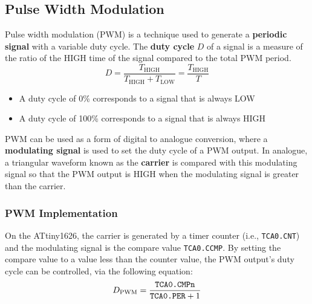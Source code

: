 \documentclass{article}
\begin{document}
\subsection{Pulse Width Modulation}
Pulse width modulation (PWM) is a technique used to generate a
\textbf{periodic signal} with a variable duty cycle. The \textbf{duty
cycle} \(D\) of a signal is a measure of the ratio of the HIGH time of
the signal compared to the total PWM period.
\begin{equation*}
    D = \frac{T_\mathrm{HIGH}}{T_\mathrm{HIGH} + T_\mathrm{LOW}} = \frac{T_\mathrm{HIGH}}{T}
\end{equation*}
\begin{itemize}
    \item A duty cycle of 0\% corresponds to a signal that is always LOW
    \item A duty cycle of 100\% corresponds to a signal that is always HIGH
\end{itemize}
PWM can be used as a form of digital to analogue conversion, where a
\textbf{modulating signal} is used to set the duty cycle of a PWM
output. In analogue, a triangular waveform known as the
\textbf{carrier} is compared with this modulating signal so that the
PWM output is HIGH when the modulating signal is greater than the
carrier.
\subsubsection{PWM Implementation}
On the ATtiny1626, the carrier is generated by a timer counter (i.e.,
\texttt{TCA0.CNT}) and the modulating signal is the compare
value \texttt{TCA0.CCMP}. By setting the compare value to a
value less than the counter value, the PWM output's duty cycle can be
controlled, via the following equation:
\begin{equation*}
    D_\mathrm{PWM} = \frac{\text{\texttt{TCA0.CMPn}}}{\text{\texttt{TCA0.PER}} + 1}
\end{equation*}
\end{document}
